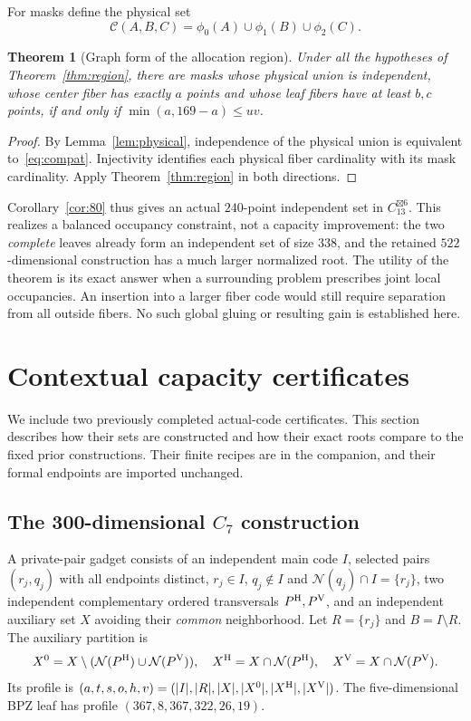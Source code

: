 \documentclass[11pt,a4paper]{article}
\newtheorem{theorem}{Theorem}[section]
\theoremstyle{definition}
\theoremstyle{remark}
\newcommand{\Nb}{\mathcal N}
\begin{document}
For masks define the physical set
\[
 \mathcal C(A,B,C)=\phi_0(A)\cup\phi_1(B)\cup\phi_2(C).
\]
\begin{theorem}[Graph form of the allocation region]\label{thm:actual}
Under all the hypotheses of Theorem~\ref{thm:region}, there are masks
whose physical union is independent, whose center fiber has exactly
$a$ points and whose leaf fibers have at least $b,c$ points, if and
only if $\min(a,169-a)\le uv$.
\end{theorem}
\begin{proof}
By Lemma~\ref{lem:physical}, independence of the physical union is
equivalent to~\eqref{eq:compat}. Injectivity identifies each physical
fiber cardinality with its mask cardinality. Apply
Theorem~\ref{thm:region} in both directions.
\end{proof}

Corollary~\ref{cor:80} thus gives an actual $240$-point independent set
in $C_{13}^{\boxtimes6}$. This realizes a balanced occupancy constraint,
not a capacity improvement: the two \emph{complete} leaves already form
an independent set of size $338$, and the retained $522$-dimensional
construction has a much larger normalized root. The utility of the
theorem is its exact answer when a surrounding problem prescribes
joint local occupancies. An insertion into a larger fiber code would
still require separation from all outside fibers. No such global
gluing or resulting gain is established here.

\section{Contextual capacity certificates}\label{sec:capacity}
We include two previously completed actual-code certificates. This
section describes how their sets are constructed and how their exact
roots compare to the fixed prior constructions. Their finite recipes
are in the companion, and their formal endpoints are imported unchanged.

\subsection{The 300-dimensional \texorpdfstring{$C_7$}{C7} construction}
A private-pair gadget consists of an independent main code $I$, selected
pairs $(r_j,q_j)$ with all endpoints distinct, $r_j\in I$, $q_j\notin I$ and
$\Nb(q_j)\cap I=\{r_j\}$, two independent complementary ordered
transversals $P^{\rm H},P^{\rm V}$, and an independent auxiliary set $X$
avoiding their \emph{common} neighborhood. Let $R=\{r_j\}$ and
$B=I\setminus R$. The auxiliary partition is
\[
 X^0=X\setminus(\Nb(P^{\rm H})\cup\Nb(P^{\rm V})),\quad
 X^{\rm H}=X\cap\Nb(P^{\rm H}),\quad
 X^{\rm V}=X\cap\Nb(P^{\rm V}).
\]
Its profile is $(a,t,s,o,h,v)=(|I|,|R|,|X|,|X^0|,|X^{\rm H}|,|X^{\rm V}|)$.
The five-dimensional BPZ leaf has profile $(367,8,367,322,26,19)$.
\end{document}

